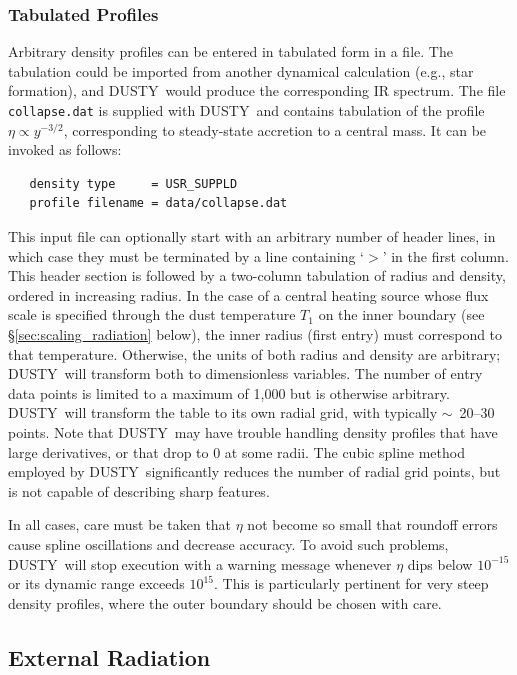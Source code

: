 \documentclass[11pt]{article}
\def\D    {{\sf DUSTY}}
\def\E#1{\hbox{$10^{#1}$}}
\def\about  {\hbox{$\sim$}}
\begin{document}
\subsubsection{Tabulated Profiles}

Arbitrary density profiles can be entered in tabulated form in a file.
The tabulation could be imported from another dynamical calculation
(e.g., star formation), and \D\ would produce the corresponding IR
spectrum. The file {\tt collapse.dat} is supplied with \D\ and
contains tabulation of the profile $\eta \propto y^{-3/2}$,
corresponding to steady-state accretion to a central mass. It can be
invoked as follows:
\begin{verbatim}
   density type     = USR_SUPPLD
   profile filename = data/collapse.dat
\end{verbatim}
This input file can optionally start with an arbitrary number of
header lines, in which case they must be terminated by a line
containing `$>$' in the first column. This header section is followed
by a two-column tabulation of radius and density, ordered in
increasing radius. In the case of a central heating source whose flux
scale is specified through the dust temperature $T_1$ on the inner
boundary (see \S\ref{sec:scaling_radiation} below), the inner radius
(first entry) must correspond to that temperature. Otherwise, the
units of both radius and density are arbitrary; \D\ will transform
both to dimensionless variables. The number of entry data points is
limited to a maximum of 1,000 but is otherwise arbitrary. \D\ will
transform the table to its own radial grid, with typically \about\
20--30 points. Note that \D\ may have trouble handling density
profiles that have large derivatives, or that drop to 0 at some
radii. The cubic spline method employed by \D\ significantly reduces
the number of radial grid points, but is not capable of describing
sharp features.

\bigskip

In all cases, care must be taken that $\eta$ not become so small that
roundoff errors cause spline oscillations and decrease accuracy.  To
avoid such problems, \D\ will stop execution with a warning message
whenever $\eta$ dips below \E{-15} or its dynamic range exceeds
\E{15}.  This is particularly pertinent for very steep density
profiles, where the outer boundary should be chosen with care.


\subsection{External Radiation}
\label{sec:External}
\end{document}

